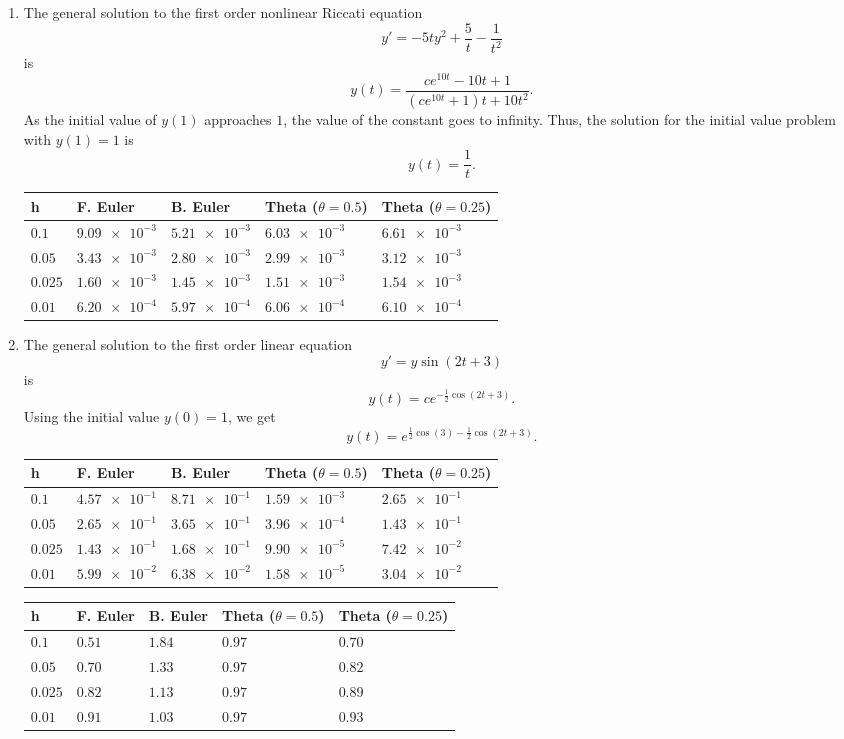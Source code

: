 \begin{solution}
  \begin{enumerate}[(1)]
    \item The general solution to the first order nonlinear Riccati equation
    \[
      y' = -5ty^2 + \frac{5}{t} - \frac{1}{t^2}
    \]
    is
    \[
      y(t) = \frac{c e^{10t} - 10t + 1}{(c e^{10t} + 1)t + 10 t^2}.
    \]
    As the initial value of $y(1)$ approaches $1$, the value of the constant goes to infinity. Thus, the solution for the initial value problem with $y(1) = 1$ is
    \[
      y(t) = \frac{1}{t}.
    \]
    \begin{tabular}{|l|l|l|l|l|}
      \hline
      h & F. Euler & B. Euler & Theta ($\theta = 0.5$) & Theta ($\theta =0.25$) \\
      \hline
      $0.1$   & $\num{9.09e-3}$ & $\num{5.21e-3}$ & $\num{6.03e-3}$ & $\num{6.61e-3}$ \\
      $0.05$  & $\num{3.43e-3}$ & $\num{2.80e-3}$ & $\num{2.99e-3}$ & $\num{3.12e-3}$ \\
      $0.025$ & $\num{1.60e-3}$ & $\num{1.45e-3}$ & $\num{1.51e-3}$ & $\num{1.54e-3}$ \\
      $0.01$  & $\num{6.20e-4}$ & $\num{5.97e-4}$ & $\num{6.06e-4}$ & $\num{6.10e-4}$ \\
      \hline
    \end{tabular}
    \item The general solution to the first order linear equation
    \[
      y' = y \sin(2t + 3)
    \]
    is 
    \[
      y(t) = c e^{-\frac12 \cos(2t + 3)}.
    \]
    Using the initial value $y(0) = 1$, we get 
    \[
      y(t) = e^{\frac12 \cos(3)-\frac12 \cos(2t + 3)}.
    \]
    \begin{tabular}{|l|l|l|l|l|}
      \hline
      h & F. Euler & B. Euler & Theta ($\theta = 0.5$) & Theta ($\theta =0.25$) \\
      \hline
      $0.1$   & $\num{4.57e-1}$ & $\num{8.71e-1}$ & $\num{1.59e-3}$ & $\num{2.65e-1}$ \\
      $0.05$  & $\num{2.65e-1}$ & $\num{3.65e-1}$ & $\num{3.96e-4}$ & $\num{1.43e-1}$ \\
      $0.025$ & $\num{1.43e-1}$ & $\num{1.68e-1}$ & $\num{9.90e-5}$ & $\num{7.42e-2}$ \\
      $0.01$  & $\num{5.99e-2}$ & $\num{6.38e-2}$ & $\num{1.58e-5}$ & $\num{3.04e-2}$ \\
      \hline
    \end{tabular}
    \begin{tabular}{|l|l|l|l|l|}
      \hline
      h & F. Euler & B. Euler & Theta ($\theta = 0.5$) & Theta ($\theta =0.25$) \\
      \hline
      $0.1$   & $0.51$ & $1.84$ & $0.97$ & $0.70$ \\
      $0.05$  & $0.70$ & $1.33$ & $0.97$ & $0.82$ \\
      $0.025$ & $0.82$ & $1.13$ & $0.97$ & $0.89$ \\
      $0.01$  & $0.91$ & $1.03$ & $0.97$ & $0.93$ \\
      \hline
    \end{tabular}
  \end{enumerate}
\end{solution}